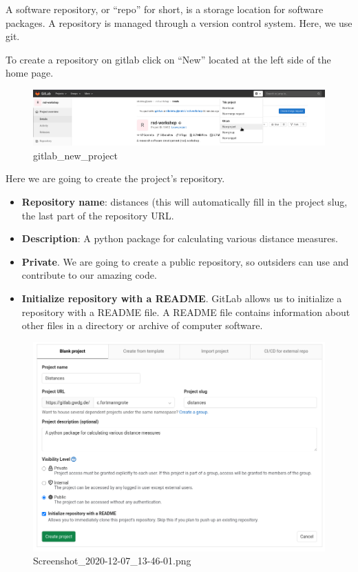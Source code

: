 \documentclass[11pt]{article}
\providecommand{\tightlist}{%
      \setlength{\itemsep}{0pt}\setlength{\parskip}{0pt}}
\begin{document}
    A software repository, or ``repo'' for short, is a storage location for
software packages. A repository is managed through a version control
system. Here, we use git.

To create a repository on gitlab click on ``New'' located at the left
side of the home page.

\begin{figure}
\centering
\includegraphics{static/new_repo_part_two.png}
\caption{gitlab\_new\_project}
\end{figure}

    Here we are going to create the project's repository.

\begin{itemize}
\tightlist
\item
  \textbf{Repository name}: distances (this will automatically fill in
  the project slug, the last part of the repository URL.
\item
  \textbf{Description}: A python package for calculating various
  distance measures.
\item
  \textbf{Private}. We are going to create a public repository, so
  outsiders can use and contribute to our amazing code.
\item
  \textbf{Initialize repository with a README}. GitLab allows us to
  initialize a repository with a README file. A README file contains
  information about other files in a directory or archive of computer
  software.
\end{itemize}

    \begin{figure}
\centering
\includegraphics{static/repo_details.png}
\caption{Screenshot\_2020-12-07\_13-46-01.png}
\end{figure}
\end{document}
